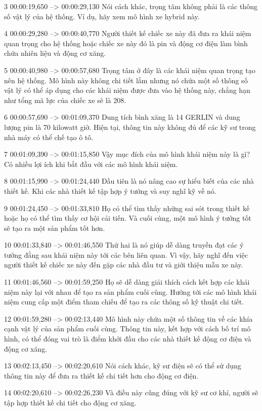 3
00:00:19,650 --> 00:00:29,130
Nói cách khác, trọng tâm không phải là các thông số vật lý của hệ thống.  Ví dụ, hãy xem mô hình xe hybrid này.

4
00:00:29,280 --> 00:00:40,770
Người thiết kế chiếc xe này đã đưa ra khái niệm quan trọng cho hệ thống hoặc chiếc xe này đó là pin và động cơ điện làm bình chứa nhiên liệu và động cơ xăng.

5
00:00:40,980 --> 00:00:57,680
Trọng tâm ở đây là các khái niệm quan trọng tạo nên hệ thống.  Mô hình này không chi tiết lắm nhưng nó chứa một số thông số vật lý có thể áp dụng cho các khái niệm được đưa vào hệ thống này, chẳng hạn như tổng mã lực của chiếc xe sẽ là 208.

6
00:00:57,690 --> 00:01:09,370
Dung tích bình xăng là 14 GERLIN và dung lượng pin là 70 kilowatt giờ.  Hiện tại, thông tin này không đủ để các kỹ sư trong nhà máy có thể chế tạo ô tô.

7
00:01:09,390 --> 00:01:15,850
Vậy mục đích của mô hình khái niệm này là gì?  Có nhiều lợi ích khi bắt đầu với các mô hình khái niệm.

8
00:01:15,990 --> 00:01:24,440
Đầu tiên là nó nâng cao sự hiểu biết của các nhà thiết kế.  Khi các nhà thiết kế tập hợp ý tưởng và suy nghĩ kỹ về nó.

9
00:01:24,450 --> 00:01:33,810
Họ có thể tìm thấy những sai sót trong thiết kế hoặc họ có thể tìm thấy cơ hội cải tiến.  Và cuối cùng, một mô hình ý tưởng tốt sẽ tạo ra một sản phẩm tốt hơn.

10
00:01:33,840 --> 00:01:46,550
Thứ hai là nó giúp dễ dàng truyền đạt các ý tưởng đằng sau khái niệm này tới các bên liên quan.  Vì vậy, hãy nghĩ đến việc người thiết kế chiếc xe này đến gặp các nhà đầu tư và giới thiệu mẫu xe này.

11
00:01:46,560 --> 00:01:59,250
Họ sẽ dễ dàng giải thích cách kết hợp các khái niệm này lại với nhau để tạo ra sản phẩm cuối cùng.  Hướng tới các mô hình khái niệm cung cấp một điểm tham chiếu để tạo ra các thông số kỹ thuật chi tiết.

12
00:01:59,280 --> 00:02:13,440
Mô hình này chứa một số thông tin về các khía cạnh vật lý của sản phẩm cuối cùng.  Thông tin này, kết hợp với cách bố trí mô hình, có thể đóng vai trò là điểm khởi đầu cho các nhà thiết kế động cơ điện và động cơ xăng.

13
00:02:13,450 --> 00:02:20,610
Nói cách khác, kỹ sư điện sẽ có thể sử dụng thông tin này để đưa ra thiết kế chi tiết hơn cho động cơ điện.

14
00:02:20,610 --> 00:02:26,230
Và điều này cũng đúng với kỹ sư cơ khí, người sẽ tập hợp thiết kế chi tiết cho động cơ xăng.

